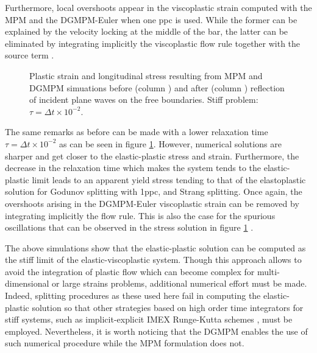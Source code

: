 Furthermore, local overshoots appear in the viscoplastic strain computed with the MPM and the DGMPM-Euler when one ppc is used. While the former can be explained by the velocity locking at the middle of the bar, the latter can be eliminated by integrating implicitly the viscoplastic flow rule together with the source term \cite{Thomas_EVP}.
\begin{figure}[h!]
  \centering
  { \label{subfig:evp_stiff1}}
  { \label{subfig:evp_stiff3}}
  {}
  \caption{Plastic strain and longitudinal stress resulting from MPM and DGMPM simuations before (column ) and after (column ) reflection of incident plane waves on the free boundaries. Stiff problem: $\tau=\Delta t \times 10^{-2}$.}
  \label{fig:siff_elastoviscoplastic_RP}
\end{figure}

The same remarks as before can be made with a lower relaxation time $\tau=\Delta t \times 10^{-2}$ as can be seen in figure \ref{fig:siff_elastoviscoplastic_RP}. However, numerical solutions are sharper and get closer to the elastic-plastic stress and strain. Furthermore, the decrease in the relaxation time which makes the system tends to the elastic-plastic limit leads to an apparent yield stress tending to that of the elastoplastic solution for Godunov splitting with 1ppc, and Strang splitting.
Once again, the overshoots arising in the DGMPM-Euler viscoplastic strain can be removed by integrating implicitly the flow rule. This is also the case for the spurious oscillations that can be observed in the stress solution in figure \ref{fig:siff_elastoviscoplastic_RP} \cite{Thomas_EVP}. 


The above simulations show that the elastic-plastic solution can be computed as the stiff limit of the elastic-viscoplastic system. Though this approach allows to avoid the integration of plastic flow which can become complex for multi-dimensional or large strains problems, additional numerical effort must be made. Indeed, splitting procedures as these used here fail in computing the elastic-plastic solution so that other strategies based on high order time integrators for stiff systems, such as implicit-explicit IMEX Runge-Kutta schemes \cite{Pareschi_stiff}, must be employed.
Nevertheless, it is worth noticing that the DGMPM enables the use of such numerical procedure while the MPM formulation does not.

